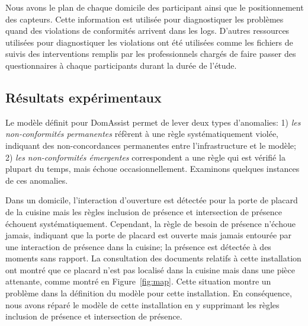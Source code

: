 Nous avons le plan de chaque domicile des participant ainsi que le positionnement des capteurs. Cette information est utilisée pour diagnostiquer les problèmes quand des violations de conformités arrivent dans les logs. D'autres ressources utilisées pour diagnostiquer les violations ont été utilisées comme les fichiers de suivis des interventions remplis par les professionnels chargés de faire passer des questionnaires à chaque participants durant la durée de l'étude.



\subsection{Résultats expérimentaux}\label{validation:results}



Le modèle définit pour DomAssist permet de lever deux types d'anomalies: 1) {\em les non-conformités permanentes} réfèrent à une règle systématiquement violée, indiquant des non-concordances permanentes entre l'infrastructure et le modèle; 2) {\em les non-conformités émergentes} correspondent a une règle qui est vérifié la plupart du temps, mais échoue occasionnellement. Examinons quelques instances de ces anomalies.

Dans un domicile, l'interaction d'ouverture est détectée pour la porte de placard de la cuisine mais les règles inclusion de présence et intersection de présence échouent systématiquement. Cependant, la règle de besoin de présence n'échoue jamais, indiquant que la porte de placard est ouverte mais jamais entourée par une interaction  de présence dans la cuisine; la présence est détectée à des moments sans rapport. La consultation des documents relatifs à cette installation ont montré que ce placard n'est pas localisé dans la cuisine mais dans une pièce attenante, comme montré en Figure~\ref{fig:map}. Cette situation montre un problème dans la définition du modèle pour cette installation. En conséquence, nous avons réparé le modèle de cette installation en y supprimant les règles inclusion de présence et intersection de présence.

